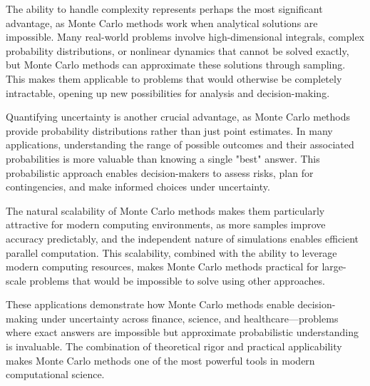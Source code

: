 The ability to handle complexity represents perhaps the most significant advantage, as Monte Carlo methods work when analytical solutions are impossible. Many real-world problems involve high-dimensional integrals, complex probability distributions, or nonlinear dynamics that cannot be solved exactly, but Monte Carlo methods can approximate these solutions through sampling. This makes them applicable to problems that would otherwise be completely intractable, opening up new possibilities for analysis and decision-making.

Quantifying uncertainty is another crucial advantage, as Monte Carlo methods provide probability distributions rather than just point estimates. In many applications, understanding the range of possible outcomes and their associated probabilities is more valuable than knowing a single "best" answer. This probabilistic approach enables decision-makers to assess risks, plan for contingencies, and make informed choices under uncertainty.

The natural scalability of Monte Carlo methods makes them particularly attractive for modern computing environments, as more samples improve accuracy predictably, and the independent nature of simulations enables efficient parallel computation. This scalability, combined with the ability to leverage modern computing resources, makes Monte Carlo methods practical for large-scale problems that would be impossible to solve using other approaches.

These applications demonstrate how Monte Carlo methods enable decision-making under uncertainty across finance, science, and healthcare—problems where exact answers are impossible but approximate probabilistic understanding is invaluable. The combination of theoretical rigor and practical applicability makes Monte Carlo methods one of the most powerful tools in modern computational science.

